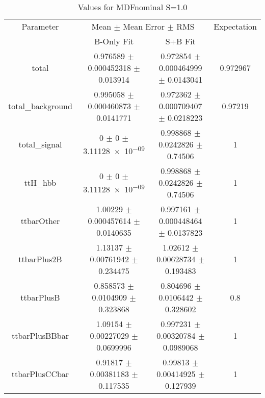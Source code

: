 \begin{table}
\centering
\caption{Values for MDFnominal S=1.0}
\begin{tabular}{cccc}
\toprule
Parameter & \multicolumn{2}{c}{Mean $\pm$ Mean Error $\pm$ RMS} & Expectation\\
 & B-Only Fit & S+B Fit & \\
\midrule
total & \num{0.976589} $\pm$ \num{0.000452318} $\pm$ \num{0.013914} & \num{0.972854} $\pm$ \num{0.000464999} $\pm$ \num{0.0143041} & \num{0.972967}\\
total\_background & \num{0.995058} $\pm$ \num{0.000460873} $\pm$ \num{0.0141771} & \num{0.972362} $\pm$ \num{0.000709407} $\pm$ \num{0.0218223} & \num{0.97219}\\
total\_signal & \num{0} $\pm$ \num{0} $\pm$ \num{3.11128e-09} & \num{0.998868} $\pm$ \num{0.0242826} $\pm$ \num{0.74506} & \num{1}\\
ttH\_hbb & \num{0} $\pm$ \num{0} $\pm$ \num{3.11128e-09} & \num{0.998868} $\pm$ \num{0.0242826} $\pm$ \num{0.74506} & \num{1}\\
ttbarOther & \num{1.00229} $\pm$ \num{0.000457614} $\pm$ \num{0.0140635} & \num{0.997161} $\pm$ \num{0.000448464} $\pm$ \num{0.0137823} & \num{1}\\
ttbarPlus2B & \num{1.13137} $\pm$ \num{0.00761942} $\pm$ \num{0.234475} & \num{1.02612} $\pm$ \num{0.00628734} $\pm$ \num{0.193483} & \num{1}\\
ttbarPlusB & \num{0.858573} $\pm$ \num{0.0104909} $\pm$ \num{0.323868} & \num{0.804696} $\pm$ \num{0.0106442} $\pm$ \num{0.328602} & \num{0.8}\\
ttbarPlusBBbar & \num{1.09154} $\pm$ \num{0.00227029} $\pm$ \num{0.0699996} & \num{0.997231} $\pm$ \num{0.00320784} $\pm$ \num{0.0989068} & \num{1}\\
ttbarPlusCCbar & \num{0.91817} $\pm$ \num{0.00381183} $\pm$ \num{0.117535} & \num{0.99813} $\pm$ \num{0.00414925} $\pm$ \num{0.127939} & \num{1}\\
\bottomrule
\end{tabular}
\end{table}